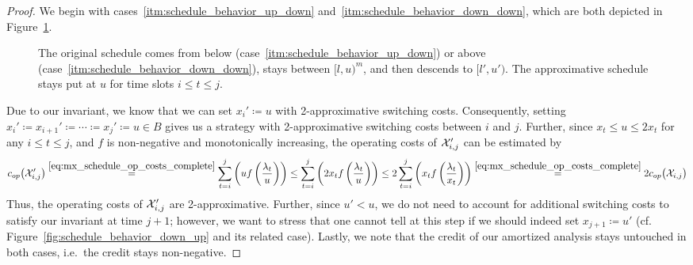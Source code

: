 \begin{proof}
We begin with cases~\ref{itm:schedule_behavior_up_down} and~\ref{itm:schedule_behavior_down_down}, which are both depicted in Figure~\ref{fig:schedule_behavior_down}.
\begin{figure}[ht]
\captionsetup[subfigure]{labelformat=empty}
\begin{subfigure}[b]{0.49\textwidth}

\end{subfigure}
\hfill
\begin{subfigure}[b]{0.49\textwidth}

\end{subfigure}
\caption{The original schedule comes from below (case~\ref{itm:schedule_behavior_up_down}) or above (case~\ref{itm:schedule_behavior_down_down}), stays between $[l,u)^m$, and then descends to $[l',u')$. The approximative schedule stays put at $u$ for time slots $i\le t\le j$.}
\label{fig:schedule_behavior_down}
\end{figure}
Due to our invariant, we know that we can set $x_i'\coloneqq u$ with 2-approximative switching costs. Consequently, setting $x_i'\coloneqq x_{i+1}'\coloneqq\dotsb\coloneqq x_j'\coloneqq u\in B$ gives us a strategy with 2-approximative switching costs between $i$ and $j$. Further, since $x_t\le u\le2x_t$ for any $i\le t\le j$, and $f$ is non-negative and monotonically increasing, the operating costs of $\mathcal{X}'_{i,j}$ can be estimated by
\begin{equation*}
	c_{op}\bigl(\mathcal{X}_{i,j}'\bigr)\stackrel{\eqref{eq:mx_schedule_op_costs_complete}}{=}\sum\limits_{t=i}^j\left(uf\left(\frac{\lambda_t}{u}\right)\right)\le\sum\limits_{t=i}^j\left(2x_tf\left(\frac{\lambda_t}{u}\right)\right)\le2\sum\limits_{t=i}^j\left(x_tf\left(\frac{\lambda_t}{x_t}\right)\right)\stackrel{\eqref{eq:mx_schedule_op_costs_complete}}{=}2c_{op}\bigl(\mathcal{X}_{i,j}\bigr)
\end{equation*}
Thus, the operating costs of $\mathcal{X}_{i,j}'$ are 2-approximative. Further, since $u'<u$, we do not need to account for additional switching costs to satisfy our invariant at time $j+1$; however, we want to stress that one cannot tell at this step if we should indeed set $x_{j+1}\coloneqq u'$ (cf. Figure~\ref{fig:schedule_behavior_down_up} and its related case). Lastly, we note that the credit of our amortized analysis stays untouched in both cases, i.e.\ the credit stays non-negative.
	

\end{proof}
